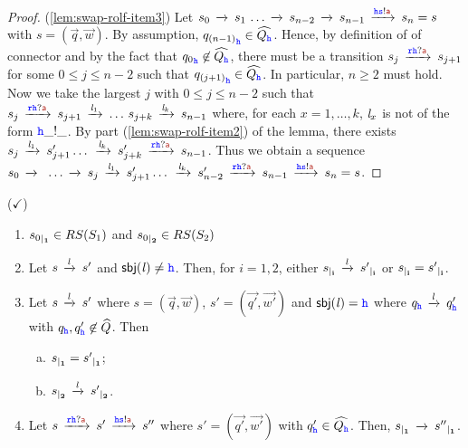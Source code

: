 \begin{proof}
(\ref{lem:swap-rolf-item3})
Let $s_0\lts{}  s_1\,\ldots \lts{} s_{n-2}  \lts{} s_{n-1}\lts{\HH\tts!\msg[a]}s_n=s$ with $s = (\vec{q},\vec{w})$.
By assumption, ${q_{(n-1)}}_{{\mathtt{\color{blue}{ {h}}}}}\in\widehat{Q_{{\mathtt{\color{blue}{ {h}}}}}}$.
Hence, by definition of of connector
 and by the fact that ${q_0}_{{\mathtt{\color{blue}{ {h}}}}}\not\in\widehat{Q_{{\mathtt{\color{blue}{ {h}}}}}}$,
 there must be a transition $s_j \lts{\ttr\HH?\msg[a]}s_{j+1}$ for
 some $0\leq j \leq n-2$ such that ${q_{(j+1)}}_{\mathtt{\color{blue}{ {h}}}}\in\widehat{Q_{\mathtt{\color{blue}{ {h}}}}}$. 
In particular, $n \geq 2$ must hold.
Now we take the largest $j$ with $0\leq j \leq n-2$ such that
 $s_j  \lts{\ttr\HH?\msg[a]} s_{j+1}\lts{\elle_1}\ldots\, s_{j+k}\lts{\elle_{k}}s_{n-1}$
 where, for each $x = 1,\ldots,k$,  $\mathit{l}_x$ is not of the form ${\mathtt{\color{blue}{ {h}}}}\_!\_$.
By part (\ref{lem:swap-rolf-item2}) of the lemma, there exists
 $s_j  \lts{\elle_1}s'_{j+1} \ldots\,  \lts{\elle_k} s'_{j+k} \lts{\ttr\HH?\msg[a]} s_{n-1}$. Thus we obtain a sequence
$s_0\lts{}\,\,\ldots \lts{}s_j  \lts{\elle_1}s'_{j+1} \ldots\,  \lts{\elle_k} s'_{n-2}\lts{\ttr\HH?\msg[a]}s_{n-1}\lts{\HH\tts!\msg[a]}s_n=s$.
\end{proof}



\begin{lemma} ($\checkmark$) \hfill
\label{lem:indrestrict}  
\begin{enumerate}[1)]
\item
\label{lem:indrestrict-a}
${s_0}_{\mid_{\mathbf{1}}}\in RS(S_1)$ and  ${s_0}_{\mid_{\mathbf{2}}}\in RS(S_2)$
\item
\label{lem:indrestrict-b}
Let $s\,\xrightarrow{\mathit{l}}_{{}}\,s'$ and $\mathsf{sbj}(\mathit{l})\neq{ \ensuremath{\mathtt{\color{blue}{ {h}}}} }$.
Then, for $i=1,2$,  either ${s}_{\mid_{\mathbf{i}}}\,\xrightarrow{\mathit{l}}_{{}}\,{s'}_{\mid_{\mathbf{i}}}$ or  ${s}_{\mid_{\mathbf{i}}}={s'}_{\mid_{\mathbf{i}}}$.
\item
\label{lem:indrestrict-c}
Let $s\,\xrightarrow{\mathit{l}}_{{}}\,s'$ where $s= (\vec{q},\vec{w})$, $s'= (\vec{q'},\vec{w'})$
and $\mathsf{sbj}(\mathit{l})={\mathtt{\color{blue}{ {h}}}}$ %
where %
$q_{\mathtt{\color{blue}{ {h}}}}\,\xrightarrow{\mathit{l}}_{{}}\,q'_{\mathtt{\color{blue}{ {h}}}}$ with $q_{\mathtt{\color{blue}{ {h}}}},q'_{\mathtt{\color{blue}{ {h}}}}\not\in\widehat{Q}$. Then
\begin{enumerate}[a)]
\item
\label{lem:indrestrict-c1}
${s}_{\mid_{\mathbf{1}}} = {s'}_{\mid_{\mathbf{1}}}$;
\item
\label{lem:indrestrict-c2}
${s}_{\mid_{\mathbf{2}}}\,\xrightarrow{\mathit{l}}_{{}}\,{s'}_{\mid_{\mathbf{2}}}$.
\end{enumerate}
\item
\label{lem:indrestrict-d}
Let $s\lts{\ttr\HH?\msg[a]} s'\lts{\HH\tts!\msg[a]} s''$ where $s'= (\vec{q'},\vec{w'})$ with $q'_{\mathtt{\color{blue}{ {h}}}}\in \widehat{Q_{\mathtt{\color{blue}{ {h}}}}}$.
Then, ${s}_{\mid_{\mathbf{1}}}\,\xrightarrow{}_{{}}\,{s''}_{\mid_{\mathbf{1}}}$.
\end{enumerate}
\end{lemma}

